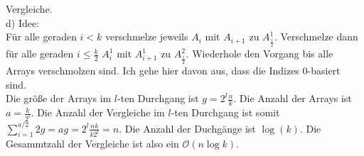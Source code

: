 \documentclass{scrartcl}
\theoremstyle{remark}
\begin{document}
{\begin{equation}
\end{equation}
Vergleiche.\\
d) Idee:\\
Für alle geraden $i < k$ verschmelze jeweils $A_i$ mit $A_{i+1}$ zu $A^1_{\frac{i}{2}}$. Verschmelze dann für alle geraden $i \leq \frac{k}{2}$ $A^1_i$ mit $A^1_{i+1}$ zu $A^2_{\frac{i}{2}}$. Wiederhole den Vorgang bis alle Arrays verschmolzen sind. Ich gehe hier davon aus, dass die Indizes $0$-basiert sind.\\
Die größe der Arrays im $l$-ten Durchgang ist $g = 2^l\frac{n}{k}$. Die Anzahl der Arrays ist $a = \frac{k}{2^l}$. Die Anzahl der Vergleiche im $l$-ten Durchgang ist somit $\sum^{a/2}_{i=1}2g = ag = 2^l\frac{nk}{k2^l} = n$. Die Anzahl der Duchgänge ist $\log(k)$. Die Gesammtzahl der Vergleiche ist also ein $\mathcal{O}(n\log k)$.\\

}
\end{document}
